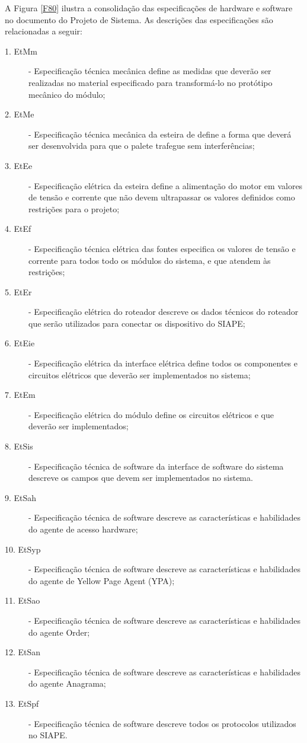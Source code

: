 A Figura \ref{F80} ilustra a consolidação das especificações de hardware e software no documento do Projeto de Sistema. As descrições das especificações são relacionadas a seguir:
	 		\begin{description}
	 			\item[1. EtMm] - Especificação técnica mecânica define as medidas que deverão ser realizadas no material especificado para transformá-lo no protótipo mecânico do módulo;
	 			\item[2. EtMe] - Especificação técnica mecânica da esteira de define a forma que deverá ser desenvolvida para que o palete trafegue sem interferências;
	 			\item[3. EtEe] - Especificação elétrica da esteira define a alimentação do motor em valores de tensão e corrente que não devem ultrapassar os valores definidos como restrições para o projeto;
	 			\item[4. EtEf] - Especificação técnica elétrica das fontes especifica os valores de tensão e corrente para todos todo os módulos do sistema, e que atendem às restrições;
	 			\item[5. EtEr] - Especificação elétrica do roteador descreve os dados técnicos do roteador que serão utilizados para conectar os dispositivo do SIAPE;
	 			\item[6. EtEie] -  Especificação elétrica da interface elétrica define todos os componentes e circuitos elétricos que deverão ser implementados no sistema;
	 			\item[7. EtEm] - Especificação elétrica do módulo define os circuitos elétricos e que deverão ser implementados;
	 			\item[8. EtSis] - Especificação técnica de software da interface de software do sistema descreve os campos que devem ser implementados no sistema.
	 			\item[9. EtSah] - Especificação técnica de software descreve as características e habilidades do agente de acesso hardware;
	 			\item[10. EtSyp] - Especificação técnica de software descreve as características e habilidades do agente de Yellow Page Agent (YPA);
	 			\item[11. EtSao] - Especificação técnica de software descreve as características e habilidades do agente Order;
	 			\item[12. EtSan] - Especificação técnica de software descreve as características e habilidades do agente Anagrama;
	 			\item[13. EtSpf] - Especificação técnica de software descreve todos os protocolos utilizados no SIAPE. 		
	 		\end{description}

